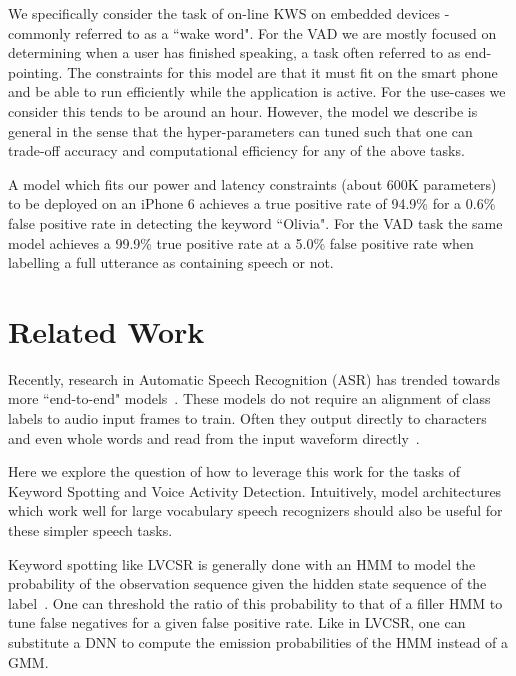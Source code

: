 We specifically consider the task of on-line KWS on embedded devices - commonly
referred to as a ``wake word". For the VAD we are mostly focused on determining
when a user has finished speaking, a task often referred to as end-pointing.
The constraints for this model are that it must fit on the smart phone and be
able to run efficiently while the application is active. For the use-cases we
consider this tends to be around an hour. However, the model we describe is
general in the sense that the hyper-parameters can tuned such that one can
trade-off accuracy and computational efficiency for any of the above tasks.

A model which fits our power and latency constraints (about 600K parameters) to
be deployed on an iPhone 6 achieves a true positive rate of 94.9\% for a 0.6\%
false positive rate in detecting the keyword ``Olivia". For the VAD task the
same model achieves a 99.9\% true positive rate at a 5.0\% false positive rate
when labelling a full utterance as containing speech or not.

\section{Related Work}
\label{sec:kws:related}

Recently, research in Automatic Speech Recognition (ASR) has trended towards
more ``end-to-end" models~\cite{hannun2014deepspeech, chan2016, chorowski2015}.
These models do not require an alignment of class labels to audio input frames
to train. Often they output directly to characters~\cite{hannun2014deepspeech}
and even whole words \cite{chan2016} and read from the input waveform
directly~\cite{zhu2016}.

Here we explore the question of how to leverage this work for the tasks of
Keyword Spotting and Voice Activity Detection. Intuitively, model architectures
which work well for large vocabulary speech recognizers should also be useful
for these simpler speech tasks. 

Keyword spotting like LVCSR is generally done with an HMM to model the
probability of the observation sequence given the hidden state sequence of the
label~\cite{rohlicek1990, rose1990}. One can threshold the ratio of this
probability to that of a filler HMM to tune false negatives for a given false
positive rate. Like in LVCSR, one can substitute a DNN to compute the emission
probabilities of the HMM instead of a GMM.


